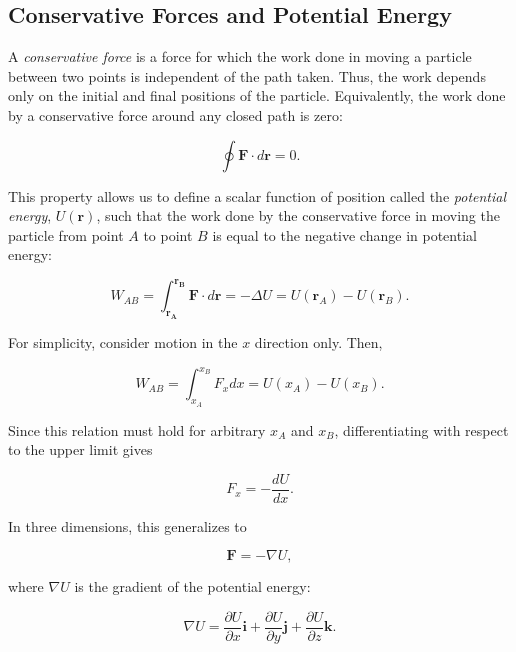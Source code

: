 \documentclass[12pt]{article}
\begin{document}
\subsection{Conservative Forces and Potential Energy}

A \emph{conservative force} is a force for which the work done in moving a particle between two points is independent of the path taken. Thus, the work depends only on the initial and final positions of the particle. Equivalently, the work done by a conservative force around any closed path is zero:

\begin{equation}
\oint \mathbf{F}\cdot d\mathbf{r} = 0.
\end{equation}

This property allows us to define a scalar function of position called the \emph{potential energy}, $U(\mathbf{r})$, such that the work done by the conservative force in moving the particle from point $A$ to point $B$ is equal to the negative change in potential energy:

\begin{equation}
W_{AB}
= \int_\mathbf{r_A}^{\mathbf{r_B}} \mathbf{F}\cdot d\mathbf{r}
= -\Delta U
= U(\mathbf{r}_A)-U(\mathbf{r}_B).
\end{equation}

For simplicity, consider motion in the $x$ direction only. Then,

\begin{equation}
W_{AB}
= \int_{x_A}^{x_B} F_xdx
= U(x_A)-U(x_B).
\end{equation}

Since this relation must hold for arbitrary $x_A$ and $x_B$, differentiating with respect to the upper limit gives

\begin{equation}
F_x = -\frac{dU}{dx}.
\end{equation}

In three dimensions, this generalizes to

\begin{equation}
\mathbf{F} = -\nabla U,
\end{equation}

where $\nabla U$ is the gradient of the potential energy:

\begin{equation}
\nabla U
= \frac{\partial U}{\partial x}\mathbf{i}
+ \frac{\partial U}{\partial y}\mathbf{j}
+ \frac{\partial U}{\partial z}\mathbf{k}.
\end{equation}
\end{document}
